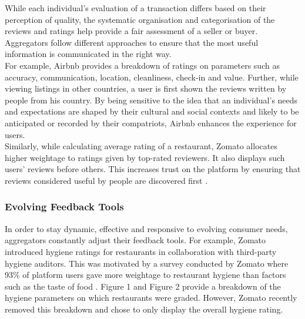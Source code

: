 \documentclass[a4paper, 12pt]{article}
\begin{document}
                    While each individual’s evaluation of a transaction differs based on their perception of quality, the systematic organisation and categorisation of the reviews and ratings help provide a fair assessment of a seller or buyer. Aggregators follow different approaches to ensure that the most useful information is communicated in the right way. \\
                    
                    For example, Airbnb provides a breakdown of ratings on parameters such as accuracy, communication, location, cleanliness, check-in and value. Further, while viewing listings in other countries, a user is first shown the reviews written by people from his country. By being sensitive to the idea that an individual’s needs and expectations are shaped by their cultural and social contexts and likely to be anticipated or recorded by their compatriots, Airbnb enhances the experience for users. \\

Similarly, while calculating average rating of a restaurant, Zomato allocates higher weightage to ratings given by top-rated reviewers. It also displays such users’ reviews before others. This increases trust on the platform by ensuring that reviews considered useful by people are discovered first \parencite{GoyalD2012}. \\
                    
                    \subsubsection{Evolving Feedback Tools}
                    
                   In order to stay dynamic, effective and responsive to evolving consumer needs, aggregators constantly adjust their feedback tools. For example, Zomato introduced hygiene ratings for restaurants in collaboration with third-party hygiene auditors. This was motivated by a survey conducted by Zomato where 93\% of platform users gave more weightage to restaurant hygiene than factors such as the taste of food \parencite{GoyalD2017}. Figure 1 and Figure 2 provide a breakdown of the hygiene parameters on which restaurants were graded. However, Zomato recently removed this breakdown and chose to only display the overall hygiene rating. \\
\end{document}
